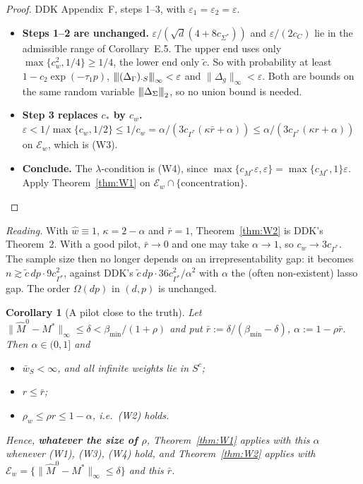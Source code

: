 \documentclass[11pt,a4paper]{article}
\numberwithin{equation}{section}
\theoremstyle{plain}
\newtheorem{corollary}[theorem]{Corollary}
\theoremstyle{remark}
\newcommand{\opnorm}[1]{{\vert\kern-0.25ex\vert\kern-0.25ex\vert #1 \vert\kern-0.25ex\vert\kern-0.25ex\vert}}
\begin{document}
\begin{proof}
DDK Appendix~F, steps 1--3, with $\varepsilon_1=\varepsilon_2=\varepsilon$.
\begin{itemize}
  \item \textbf{Steps 1--2 are unchanged.} $\varepsilon/(\sqrt d(4+8c_{\Sigma^*}))$ and $\varepsilon/(2c_C)$ lie in the admissible range of Corollary~E.5. The upper end uses only $\max\{c_w^2,1/4\}\ge1/4$, the lower end only $\tilde c$. So with probability at least $1-c_2\exp(-\tau_1p)$, $\opnorm{(\Delta_\Gamma)_{\cdot S}}_\infty<\varepsilon$ and $\|\Delta_g\|_\infty<\varepsilon$. Both are bounds on the same random variable $\opnorm{\Delta_\Sigma}_2$, so no union bound is needed.
  \item \textbf{Step 3 replaces $c_*$ by $c_w$.} $\varepsilon<1/\max\{c_w,1/2\}\le1/c_w=\alpha/(3c_{\Gamma^*}(\kappa\bar r+\alpha))\le\alpha/(3c_{\Gamma^*}(\kappa r+\alpha))$ on $\mathcal E_w$, which is (W3).
  \item \textbf{Conclude.} The $\lambda$-condition is (W4), since $\max\{c_{M^*}\varepsilon,\varepsilon\}=\max\{c_{M^*},1\}\varepsilon$. Apply Theorem~\ref{thm:W1} on $\mathcal E_w\cap\{\text{concentration}\}$.\qedhere
\end{itemize}
\end{proof}

\emph{Reading.} With $\hat w\equiv1$, $\kappa=2-\alpha$ and $\bar r=1$, Theorem~\ref{thm:W2} is DDK's Theorem~2. With a good pilot, $\bar r\to0$ and one may take $\alpha\to1$, so $c_w\to3c_{\Gamma^*}$. The sample size then no longer depends on an irrepresentability gap: it becomes $n\gtrsim\tilde c\,dp\cdot9c_{\Gamma^*}^2$, against DDK's $\tilde c\,dp\cdot36c_{\Gamma^*}^2/\alpha^2$ with $\alpha$ the (often non-existent) lasso gap. The order $\Omega(dp)$ in $(d,p)$ is unchanged.
\begin{corollary}[A pilot close to the truth]\label{cor:W3}
Let $\|\hat M^0-M^*\|_\infty\le\delta<\beta_{\min}/(1+\rho)$ and put
$\bar r:=\delta/(\beta_{\min}-\delta)$, $\alpha:=1-\rho\bar r$. Then $\alpha\in(0,1]$ and
\begin{itemize}
  \item[(i)] $\bar w_S<\infty$, and all infinite weights lie in $S^c$;
  \item[(ii)] $r\le\bar r$;
  \item[(iii)] $\rho_w\le\rho r\le1-\alpha$, i.e.\ (W2) holds.
\end{itemize}
Hence, \textbf{whatever the size of $\rho$}, Theorem~\ref{thm:W1} applies with this $\alpha$
whenever (W1), (W3), (W4) hold, and Theorem~\ref{thm:W2} applies with
$\mathcal E_w=\{\|\hat M^0-M^*\|_\infty\le\delta\}$ and this $\bar r$.
\end{corollary}
\end{document}
